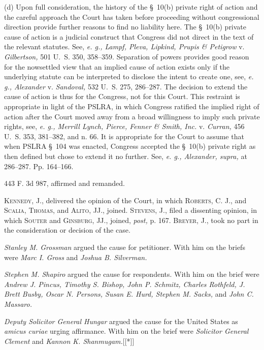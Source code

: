   (d) Upon full consideration, the history of the \S~10(b) private right of action and the careful approach the Court has taken before proceeding without congressional direction provide further reasons to find no liability here. The \S~10(b) private cause of action is a judicial construct that Congress did not direct in the text of the relevant statutes. See, \emph{e. g., Lampf, Pleva, Lipkind, Prupis \& Petigrow} v. \emph{Gilbertson,} 501 U.~S. 350, 358--359. Separation of powers provides good reason for the nowsettled view that an implied cause of action exists only if the underlying statute can be interpreted to disclose the intent to create one, see, \emph{e. g., Alexander} v. \emph{Sandoval,} 532 U.~S. 275, 286--287. The decision to extend the cause of action is thus for the Congress, not for this Court. This restraint is appropriate in light of the PSLRA, in which Congress ratified the implied right of action after the Court moved away from a broad willingness to imply such private rights, see, \emph{e. g., Merrill Lynch, Pierce, Fenner \& Smith, Inc.} v. \emph{Curran,} 456 U.~S. 353, 381--382, and n. 66. It is appropriate for the Court to assume that when PSLRA \S~104 was enacted, Congress accepted the \S~10(b) private right as then defined but chose to extend it no further. See, \emph{e. g., Alexander, supra,} at 286--287. Pp. 164--166.

443 F. 3d 987, affirmed and remanded.

  \textsc{Kennedy,} J., delivered the opinion of the Court, in which \textsc{Roberts,} C. J., and \textsc{Scalia, Thomas,} and \textsc{Alito,} JJ., joined. \textsc{Stevens,} J., filed a dissenting opinion, in which \textsc{Souter} and \textsc{Ginsburg,} JJ., joined, \emph{post,} p. 167. \textsc{Breyer,} J., took no part in the consideration or decision of the case.

  \emph{Stanley M. Grossman} argued the cause for petitioner. With him on the briefs were \emph{Marc I. Gross} and \emph{Joshua B. Silverman.}

  \emph{Stephen M. Shapiro} argued the cause for respondents. With him on the brief were \emph{Andrew J. Pincus, Timothy S. Bishop, John P. Schmitz, Charles Rothfeld, J. Brett Busby, Oscar N. Persons, Susan E. Hurd, Stephen M. Sacks,} and \emph{John C. Massaro.}

  \emph{Deputy Solicitor General Hungar} argued the cause for the United States as \emph{amicus curiae} urging affirmance. \newpage  With him on the brief were \emph{Solicitor General Clement} and \emph{Kannon K. Shanmugam.}[[*]]

